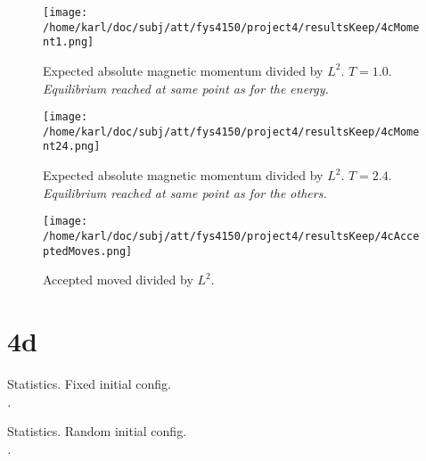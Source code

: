 \documentclass{article}
\begin{document}
\begin{minipage}{.45\textwidth} 
	\begin{figure}[H]
		\centering
		\texttt{[image: /home/karl/doc/subj/att/fys4150/project4/resultsKeep/4cMoment1.png]}
		\caption{Expected absolute magnetic momentum divided by $L^2$. $T = 1.0$. \\ \textit{Equilibrium reached at same point as for the energy.}}
		\label{1}
	\end{figure}
\end{minipage}\hfill
\begin{minipage}{.45\textwidth} 
	\begin{figure}[H]
		\centering
		\texttt{[image: /home/karl/doc/subj/att/fys4150/project4/resultsKeep/4cMoment24.png]}
		\caption{Expected absolute magnetic momentum divided by $L^2$. $T = 2.4$. \\ \textit{Equilibrium reached at same point as for the others.}}
		\label{1}
	\end{figure}
\end{minipage}\hfill
\vspace{2ex}

\begin{figure}[H]
	\centering
	\texttt{[image: /home/karl/doc/subj/att/fys4150/project4/resultsKeep/4cAcceptedMoves.png]}
	\caption{Accepted moved divided by $L^2$. \\ \textit{}}
	\label{1}
\end{figure}

\section{4d}


\begin{table}[H]
	\centering
	\begin{adjustbox}{width=1\textwidth}
	\end{adjustbox}
	\caption{Statistics. Fixed initial config. \\ \textit{.}}
	\label{1}
\end{table}

\begin{table}[H]
	\centering
	\begin{adjustbox}{width=1\textwidth}
	\end{adjustbox}
	\caption{Statistics. Random initial config. \\ \textit{.}}
	\label{1}
\end{table}
\end{document}
